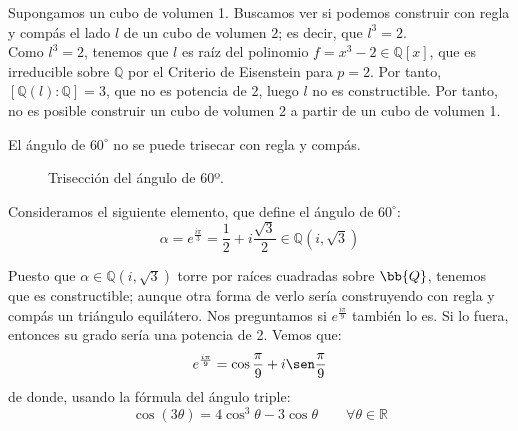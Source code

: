 \begin{ejemplo}
    Supongamos un cubo de volumen 1. Buscamos ver si podemos construir con regla y compás el lado $l$ de un cubo de volumen $2$; es decir, que $l^3=2$.\\

    Como $l^3=2$, tenemos que $l$ es raíz del polinomio $f = x^3-2\in \mathbb{Q}[x]$, que es irreducible sobre $\mathbb{Q}$ por el Criterio de Eisenstein para $p=2$. Por tanto, $[\mathbb{Q}(l):\mathbb{Q}] = 3$, que no es potencia de 2, luego $l$ no es constructible. Por tanto, no es posible construir un cubo de volumen 2 a partir de un cubo de volumen 1.
\end{ejemplo}

\begin{ejemplo}
    El ángulo de $60^\circ$ no se puede trisecar con regla y compás.\\
    \begin{figure}[h]
        \centering
        \caption{Trisección del ángulo de 60º.}
        \label{fig:trisecion_60}
    \end{figure}

    Consideramos el siguiente elemento, que define el ángulo de $60^\circ$:
    \begin{equation*}
        \alpha = e^{\frac{i\pi}{3}} = \dfrac{1}{2} + i\dfrac{\sqrt{3}}{2} \in \mathbb{Q}\left(i,\sqrt{3}\right)
    \end{equation*}

    Puesto que $\alpha\in \mathbb{Q}\left(i,\sqrt{3}\right)$ torre por raíces cuadradas sobre $\bb{Q}$, tenemos que es constructible; aunque otra forma de verlo sería construyendo con regla y compás un triángulo equilátero. Nos preguntamos si $e^{\frac{i\pi}{9}}$ también lo es. Si lo fuera, entonces su grado sería una potencia de 2. Vemos que:
    \begin{equation*}
        e^{\frac{i\pi}{9}} = \cos \dfrac{\pi}{9} + i\sen \dfrac{\pi}{9}
    \end{equation*}
    de donde, usando la fórmula del ángulo triple:
    \begin{equation*}
        \cos(3\theta) = 4\cos^3\theta - 3\cos \theta \qquad \forall \theta\in \mathbb{R}
    \end{equation*}


\end{ejemplo}
